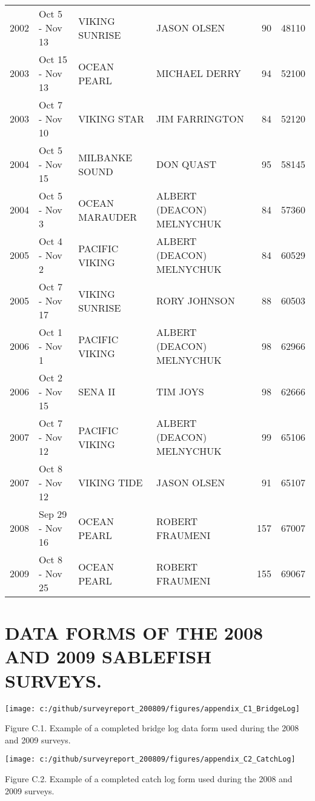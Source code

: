 \documentclass[12pt]{article}\usepackage[]{graphicx}\usepackage[]{color}
\begin{document}
\begin{appendices}
\begin{longtable}{rlllrr}
2002 & Oct  5  - Nov 13 & VIKING SUNRISE & JASON OLSEN & 90 & 48110\\
2003 & Oct 15  - Nov 13 & OCEAN PEARL & MICHAEL DERRY & 94 & 52100\\
2003 & Oct  7  - Nov 10 & VIKING STAR & JIM FARRINGTON & 84 & 52120\\
2004 & Oct  5  - Nov 15 & MILBANKE SOUND & DON QUAST & 95 & 58145\\
2004 & Oct  5  - Nov  3 & OCEAN MARAUDER & ALBERT (DEACON) MELNYCHUK & 84 & 57360\\
2005 & Oct  4  - Nov  2 & PACIFIC VIKING & ALBERT (DEACON) MELNYCHUK & 84 & 60529\\
2005 & Oct  7  - Nov 17 & VIKING SUNRISE & RORY JOHNSON & 88 & 60503\\
2006 & Oct  1  - Nov  1 & PACIFIC VIKING & ALBERT (DEACON) MELNYCHUK & 98 & 62966\\
2006 & Oct  2  - Nov 15 & SENA II & TIM JOYS & 98 & 62666\\
2007 & Oct  7  - Nov 12 & PACIFIC VIKING & ALBERT (DEACON) MELNYCHUK & 99 & 65106\\
2007 & Oct  8  - Nov 12 & VIKING TIDE & JASON OLSEN & 91 & 65107\\
2008 & Sep 29  - Nov 16 & OCEAN PEARL & ROBERT FRAUMENI & 157 & 67007\\
2009 & Oct  8  - Nov 25 & OCEAN PEARL & ROBERT FRAUMENI & 155 & 69067\\
\bottomrule
\end{longtable}
\endgroup{}
\clearpage

\section{DATA FORMS OF THE 2008 AND 2009 SABLEFISH SURVEYS.}
\label{app:third-appendix}
\begin{center}\texttt{[image: c:/github/surveyreport\_200809/figures/appendix\_C1\_BridgeLog]} \end{center}

Figure C.1. Example of a completed bridge log data form used during the 2008 and 2009 surveys.

\clearpage
\begin{center}\texttt{[image: c:/github/surveyreport\_200809/figures/appendix\_C2\_CatchLog]} \end{center}

Figure C.2. Example of a completed catch log form used during the 2008 and 2009 surveys.


\end{appendices}
\end{document}
